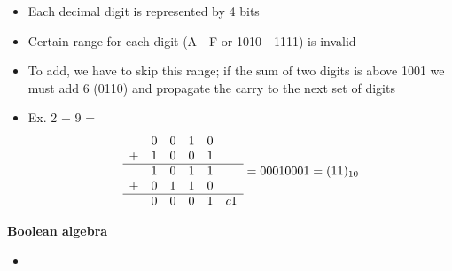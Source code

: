 \documentclass{article}
\begin{document}
\begin{itemize}
    \item Each decimal digit is represented by 4 bits 
    \item Certain range for each digit (A - F or 1010 - 1111) is invalid 
    \item To add, we have to skip this range; if the sum of two digits is above 1001 we must add 6 (0110) and propagate the carry to the next set of digits
    \item Ex. 2 + 9 =
    \begin{equation*}
        \begin{array}{cccccc}
              & 0 & 0 & 1 & 0 & \\
            + & 1 & 0 & 0 & 1 & \\
            \hline
              & 1 & 0 & 1 & 1 & \\
            + & 0 & 1 & 1 & 0 & \\
            \hline
              & 0 & 0 & 0 & 1 & c 1\\ 
        \end{array}
        = 0001 0001 = (11)_{10}
    \end{equation*}
\end{itemize}
\textbf{Boolean algebra}
\begin{itemize}
    \item 
\end{itemize}
\end{document}
